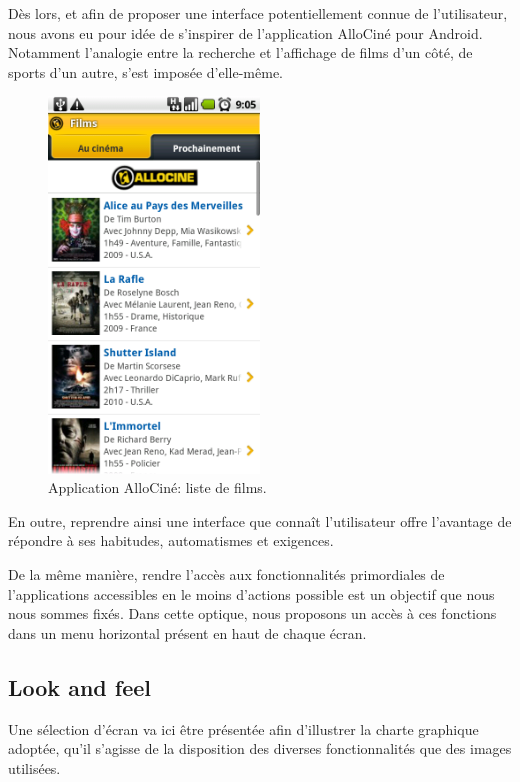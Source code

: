 \documentclass{article}
\begin{document}
	Dès lors, et afin de proposer une interface potentiellement connue de
	l'utilisateur, nous avons eu pour idée de s'inspirer de l'application AlloCiné
	pour Android.
	Notamment l'analogie entre la recherche et l'affichage de films d'un côté, de
	sports d'un autre, s'est imposée d'elle-même.

	\begin{figure}[ht]
		\centering
		\includegraphics[width=0.5\textwidth]{allocine.png}
		\caption{Application AlloCiné: liste de films.}
		\label{fig:allocine}
	\end{figure}

	En outre, reprendre ainsi une interface que connaît l'utilisateur offre
	l'avantage de répondre à ses habitudes, automatismes et exigences.

	De la même manière, rendre l'accès aux fonctionnalités primordiales de
	l'applications accessibles en le moins d'actions possible est un objectif que
	nous nous sommes fixés.
	Dans cette optique, nous proposons un accès à ces fonctions dans un menu
	horizontal présent en haut de chaque écran.

	\subsection{Look and feel}

	Une sélection d'écran va ici être présentée afin d'illustrer la charte
	graphique adoptée, qu'il s'agisse de la disposition des diverses
	fonctionnalités que des images utilisées.
\end{document}

